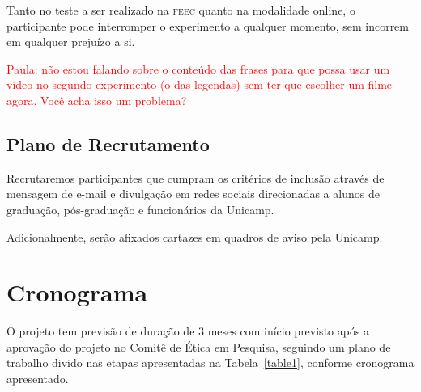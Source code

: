 \documentclass[a4paper,11pt,titlepage,singlespacing]{article}
\newcommand\todo[1]{\textcolor{red}{#1}}
\begin{document}
Tanto no teste a ser realizado na \textsc{feec} quanto na modalidade online, o participante pode interromper o experimento a qualquer momento, sem incorrem em qualquer prejuízo a si.

\todo{Paula: não estou falando sobre o conteúdo das frases para que possa usar um vídeo no segundo experimento (o das legendas) sem ter que escolher um filme agora. Você acha isso um problema?}





\subsection{Plano de Recrutamento}

\noindent Recrutaremos participantes que cumpram os critérios de inclusão através de mensagem de e-mail e divulgação em redes sociais direcionadas a alunos de graduação, pós-graduação e funcionários da Unicamp.

Adicionalmente, serão afixados cartazes em quadros de aviso pela Unicamp.

\section{Cronograma}
\noindent O projeto tem previsão de duração de 3 meses com início previsto após a aprovação do projeto no Comitê de Ética em Pesquisa, seguindo um plano de trabalho divido nas etapas apresentadas na Tabela~\ref{table1}, conforme cronograma apresentado.
\end{document}
